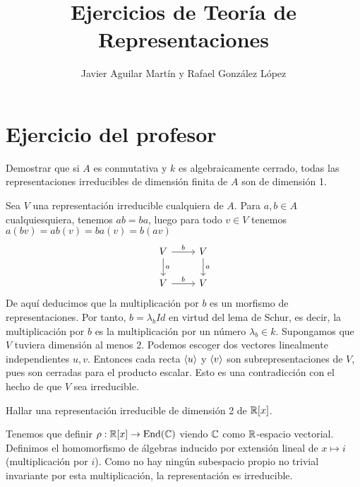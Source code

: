 \documentclass[twoside]{article}
\begin{document}
\title{Ejercicios de Teoría de Representaciones}
\author{Javier Aguilar Martín y Rafael González López}
\maketitle

\section{Ejercicio del profesor}
\begin{ejercicio}{1}
Demostrar que si $A$ es conmutativa y $k$ es algebraicamente cerrado, todas las representaciones irreducibles de dimensión finita de $A$ son de dimensión 1. 
\end{ejercicio}
\begin{solucion}
Sea $V$ una representación irreducible cualquiera de $A$. Para $a,b\in A$ cualquiesquiera, tenemos $ab=ba$, luego para todo $v\in V$ tenemos $a(bv) =ab(v)=ba(v)=b(av)$
\[
\begin{tikzcd}
V\arrow[r, "b"] \arrow[d, "a"] & V\arrow[d, "a"]\\
V\arrow[r, "b"] & V
\end{tikzcd}
\]
De aquí deducimos que la multiplicación por $b$ es un morfismo de representaciones. Por tanto, $b=\lambda_b Id$ en virtud del lema de Schur, es decir, la multiplicación por $b$ es la multiplicación por un número $\lambda_b\in k$. Supongamos que $V$ tuviera dimensión al menos 2. Podemos escoger dos vectores linealmente independientes $u,v$. Entonces cada recta $\langle{u}\rangle$ y $\langle{v}\rangle$ son subrepresentaciones de $V$, pues son cerradas para el producto escalar. Esto es una contradicción con el hecho de que $V$ sea irreducible. 
\end{solucion}

\newpage

\begin{ejercicio}{2}
Hallar una representación irreducible de dimensión 2 de $\mathbb{R}[x]$. 
\end{ejercicio}
\begin{solucion}
Tenemos que definir $\rho:\mathbb{R}[x]\to \operatorname{End}(\mathbb{C})$ viendo $\mathbb{C}$ como $\mathbb{R}$-espacio vectorial. Definimos el homomorfismo de álgebras inducido por extensión lineal de $x\mapsto i$ (multiplicación por $i$). Como no hay ningún subespacio propio no trivial invariante por esta multiplicación, la representación es irreducible.  
\end{solucion}

\newpage
\end{document}
